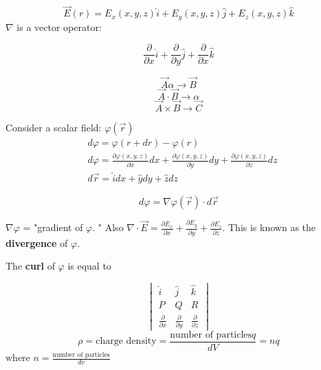 \documentclass[svgnames]{article}   	%
\begin{document}
\vspace{5px}\[
  \vec{E}(r) = E_x(x,y,z)\hat{i} + E_y(x,y,z)\hat{j} + E_z(x,y,z)\hat{k}
\] \vspace{5px}
\newpage
$\nabla$ is a vector operator: 

\vspace{5px} \[
  \frac{\partial }{\partial x} \hat{i} + \frac{\partial }{\partial y} \hat{j}
  + \frac{\partial }{\partial x} \hat{k}
\] \vspace{5px}

\begin{tcolorbox}[colback = red!5!white, colframe = red!50!black, title
  = Vector Operations]
  
  \[
    \vec{A}\alpha \rightarrow \vec{B}
  \]
  \[
    \vec{A} \cdot \vec{B} \rightarrow \alpha
  \]
  \[
    \vec{A} \times \vec{B} \rightarrow \vec{C}
  \]

\end{tcolorbox}
\vspace{5px}

Consider a scalar field: $\varphi(\vec{r})$
\begin{align*}
&d\varphi = \varphi(r + dr) - \varphi(r) \\
&d\varphi = \frac{\partial \varphi(x,y,z)}{\partial x}dx + \frac{\partial
\varphi(x,y,z)}{\partial y}dy + \frac{\partial \varphi(x,y,z)}{\partial z}dz\\
&d\vec{r} = \hat{i}dx + \hat{y}dy + \hat{z}dz
\end{align*}
\begin{tcolorbox}
\[
  d\varphi = \nabla \varphi(\vec{r}) \cdot d\vec{r}
\]
\end{tcolorbox}
\vspace{5px}

$\nabla \varphi$ = "gradient of $\varphi$. " Also $\nabla \cdot \vec{E}
= \frac{\partial E_x}{\partial x}+ \frac{\partial E_y}{\partial y}
+ \frac{\partial E_z}{\partial z}$. This is known as the \textbf{divergence} of
$\varphi$. 
\vspace{10px}

The \textbf{curl} of $\varphi$ is equal to 

\vspace{5px} \[
\begin{vmatrix}
  \hat{i} & \hat{j} & \hat{k} \\
  P & Q & R \\
  \frac{\partial }{\partial x} & \frac{\partial }{\partial y} & \frac{\partial
  }{\partial z}  
\end{vmatrix}
\] \vspace{5px}
\[
  \rho = \text{charge density} = \frac{\text{number of particles} q}{dV} = nq
\] \vspace{5px}
where $n = \frac{\text{number of particles}}{dv}$
\end{document}
